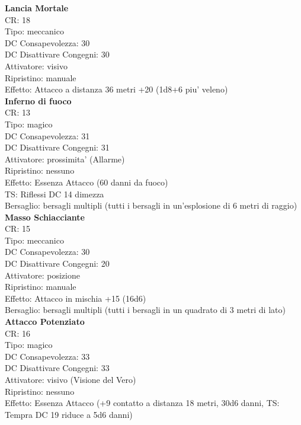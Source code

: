 \documentclass[a4paper,11pt,twoside,openany]{dndbook}
\begin{document}
{\begin{multicols}{2}
\textbf{Lancia Mortale}\\
CR: 18 \\
Tipo: meccanico \\
DC Consapevolezza: 30 \\
DC Disattivare Congegni: 30 \\
Attivatore: visivo\\
Ripristino: manuale \\
Effetto: Attacco a distanza 36 metri +20 (1d8+6 piu' veleno)\\

\textbf{Inferno di fuoco}\\
CR: 13 \\
Tipo: magico \\
DC Consapevolezza: 31 \\
DC Disattivare Congegni: 31 \\
Attivatore: prossimita' (Allarme) \\
Ripristino: nessuno \\
Effetto: Essenza Attacco (60 danni da fuoco) \\
TS: Riflessi DC 14 dimezza \\
Bersaglio: bersagli multipli (tutti i bersagli in un’esplosione di 6 metri di raggio)\\

\textbf{Masso Schiacciante}\\
CR: 15 \\
Tipo: meccanico \\
DC Consapevolezza: 30 \\
DC Disattivare Congegni: 20 \\
Attivatore: posizione \\
Ripristino: manuale \\
Effetto: Attacco in mischia +15 (16d6) \\
Bersaglio: bersagli multipli (tutti i bersagli in un quadrato di 3 metri di lato)\\

\textbf{Attacco Potenziato}\\
CR: 16 \\
Tipo: magico \\
DC Consapevolezza: 33 \\
DC Disattivare Congegni: 33 \\
Attivatore: visivo (Visione del Vero) \\
Ripristino: nessuno \\
Effetto: Essenza Attacco (+9 contatto a distanza 18 metri, 30d6 danni, TS: Tempra DC 19 riduce a 5d6 danni)\\


\end{multicols}}
\end{document}
